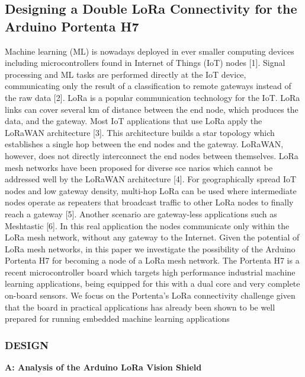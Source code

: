 	


\subsection{Designing a Double LoRa Connectivity for the Arduino Portenta H7}
\label{P2P}

 Machine learning (ML) is nowadays deployed in ever smaller
computing devices including microcontrollers found in Internet
of Things (IoT) nodes [1]. Signal processing and ML tasks
are performed directly at the IoT device, communicating only
the result of a classification to remote gateways instead of the
raw data [2].
LoRa is a popular communication technology for the IoT.
LoRa links can cover several km of distance between the end
node, which produces the data, and the gateway. Most IoT
applications that use LoRa apply the LoRaWAN architecture
[3]. This architecture builds a star topology which establishes a
single hop between the end nodes and the gateway. LoRaWAN,
however, does not directly interconnect the end nodes between
themselves. \cite{PortentaLANMAN2022}
\newline
LoRa mesh networks have been proposed for diverse sce
narios which cannot be addressed well by the LoRaWAN
architecture [4]. For geographically spread IoT nodes and
low gateway density, multi-hop LoRa can be used where
intermediate nodes operate as repeaters that broadcast traffic
to other LoRa nodes to finally reach a gateway [5]. Another
scenario are gateway-less applications such as Meshtastic [6].
In this real application the nodes communicate only within the
LoRa mesh network, without any gateway to the Internet.
Given the potential of LoRa mesh networks, in this paper
we investigate the possibility of the Arduino Portenta H7 for
becoming a node of a LoRa mesh network. The Portenta H7 is
a recent microcontroller board which targets high performance
 industrial machine learning applications, being equipped for
this with a dual core and very complete on-board sensors. We
focus on the Portenta’s LoRa connectivity challenge given that
the board in practical applications has already been shown
to be well prepared for running embedded machine learning
applications \cite{PortentaLANMAN2022}\newline

\subsubsection{DESIGN}

\textbf{A: Analysis of the Arduino LoRa Vision Shield}\newline

